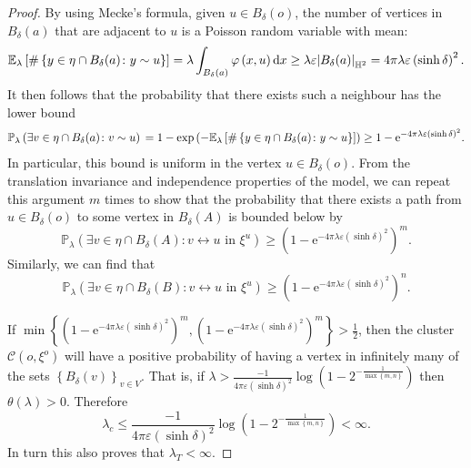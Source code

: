 \documentclass[10pt,a4paper,dvipsnames]{article}
\theoremstyle{definition}
\theoremstyle{remark}
\newcommand{\pla}{\mathbb P_\lambda}
\newcommand{\E}{\mathbb E}
\newcommand{\HypTwo}{{\mathbb{H}^2}}
\newcommand{\dd}{\mathrm{d}} %
\newcommand{\C}{\mathscr {C}}
\newcommand{\conn}[3]{#1 \longleftrightarrow #2\textrm { in } #3}
\DeclarePairedDelimiter\abs{\lvert}{\rvert}
\newcommand{\habs}[1]{\abs*{#1}_\HypTwo}
\newcommand{\orig}{o}
\newcommand{\e}{\mathrm{e}}
\newcommand{\connf}{\varphi}
\numberwithin{equation}{section}
\begin{document}
\begin{proof}
    By using Mecke's formula, given $u\in B_\delta(\orig)$, the number of vertices in $B_\delta(a)$ that are adjacent to $u$ is a Poisson random variable with mean:
\begin{equation}
    \E_{\lambda}\left[\#\left\{y\in\eta\cap B_\delta(a) \colon y \sim u\right\}\right] = \lambda \int_{B_\delta(a)} \connf\left(x,u\right)\dd x \geq \lambda \varepsilon \habs{B_\delta(a)} = 4\pi\lambda\varepsilon\left(\sinh \delta\right)^2.
\end{equation}
It then follows that the probability that there exists such a neighbour has the lower bound
\begin{equation}
    \pla\left(\exists v\in\eta\cap B_\delta(a) \colon v \sim u\right) \\= 1 - \exp\left(-\E_{\lambda}\left[\#\left\{y\in\eta\cap B_\delta(a) \colon y \sim u\right\}\right]\right) \geq 1- \e^{-4\pi\lambda\varepsilon\left(\sinh \delta\right)^2}.
\end{equation}
In particular, this bound is uniform in the vertex $u\in B_\delta(\orig)$. From the translation invariance and independence properties of the model, we can repeat this argument $m$ times to show that the probability that there exists a path from $u\in B_\delta(\orig)$ to some vertex in $B_\delta(A)$ is bounded below by
\begin{equation}
    \pla\left(\exists v\in\eta\cap B_\delta(A) \colon \conn{v}{u}{\xi^u}\right) \geq \left(1- \e^{-4\pi\lambda\varepsilon\left(\sinh \delta\right)^2}\right)^m.
\end{equation}
Similarly, we can find that
\begin{equation}
    \pla\left(\exists v\in\eta\cap B_\delta(B) \colon \conn{v}{u}{\xi^u}\right) \geq \left(1- \e^{-4\pi\lambda\varepsilon\left(\sinh \delta\right)^2}\right)^n.
\end{equation}

If $\min\left\{\left(1- \e^{-4\pi\lambda\varepsilon\left(\sinh \delta\right)^2}\right)^m,\left(1- \e^{-4\pi\lambda\varepsilon\left(\sinh \delta\right)^2}\right)^m\right\}>\frac{1}{2}$, then the cluster $\C(\orig,\xi^\orig)$ will have a positive probability of having a vertex in infinitely many of the sets $\left\{B_\delta(v)\right\}_{v\in V}$. That is, if $\lambda>\frac{-1}{4\pi\varepsilon\left(\sinh\delta\right)^2}\log\left(1-2^{-\frac{1}{\max\left\{m,n\right\}}}\right)$ then $\theta\left(\lambda\right)>0$. Therefore
\begin{equation}
    \lambda_c \leq \frac{-1}{4\pi\varepsilon\left(\sinh\delta\right)^2}\log\left(1-2^{-\frac{1}{\max\left\{m,n\right\}}}\right)<\infty.
\end{equation}
In turn this also proves that $\lambda_T<\infty$.
\end{proof}
\end{document}
